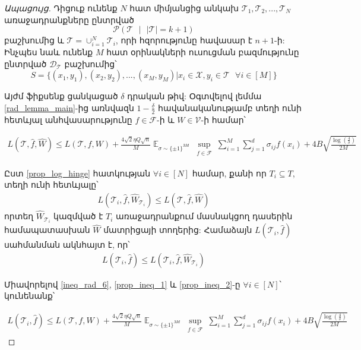 \documentclass[12pt]{article}
\DeclareMathOperator*{\E}{\mathbb{E}}
\begin{document}
\begin{proof}[Ապացույց] 
Դիցուք ունենք $N$ հատ միմյանցից անկախ $\mathcal{T}_1,\mathcal{T}_2, ...,\mathcal{T}_N$  առաջադրանքները ընտրված 
$$\mathcal{P}(\mathcal{T} \text{ } |\text{ }  |\mathcal{T}| = k +1)$$
բաշխումից և $\mathcal{T} = \cup_{i=1}^N\mathcal{T}_i$, որի հզորությունը հավասար է $n+1$-ի: Ինչպես նաև ունենք $M$ հատ օրինակների ուսուցման բազմությունը ընտրված $\mathcal{D_\mathcal{T}}$ բաշխումից՝
$$S = \{(x_1, y_1), (x_2, y_2), ..., (x_M, y_M) | x_i \in \mathcal{X}, y_i \in \mathcal{T} \text{ }\forall i \in[M]\}$$

\noindent Այժմ ֆիքսենք ցանկացած $\delta$ դրական թիվ: Օգտվելով լեմմա \ref{rad_lemma_main}-ից առնվազն $1-\frac{\delta}{2}$ հավանականությամբ տեղի ունի հետևյալ անհվասարությունը $f \in \mathcal{F}$-ի և $W \in \mathcal{V}$-ի համար՝

\begin{align}
\label{ineq_rad_6}
L(\mathcal{T}, \hat{f}, \hat{W}) \leq  L(\mathcal{T}, f, W) + \frac{4\sqrt{2} \eta Q\sqrt{n}}{M} \E_{\sigma \sim \{\pm1\}^{Md}} \sup_{\substack{ f  \in \mathcal{F}  }}\sum_{i=1}^M \sum_{j=1}^d \sigma_{ij}f(x_i)+    4B\sqrt{\frac{\log \left( \frac{4}{\delta} \right)}{2M}}
\end{align}

\noindent Ըստ \ref{prop_log_hinge} հատկության $\forall i \in [N]$ համար, քանի որ $T_i \subseteq T$, տեղի ունի հետևյալը՝
\begin{align}
\label{prop_ineq_1}
L(\mathcal{T}_i, \hat{f}, \hat{W}_{\mathcal{T}_i}) \leq L(\mathcal{T}, \hat{f}, \hat{W} )
\end{align}
 որտեղ $\hat{W}_{\mathcal{T}_i}$ կազմված է $T_i$ առաջադրանքում մասնակցող դասերին համապատասխան  $\hat{W}$ մատրիցայի տողերից: Համաձայն $L(\mathcal{T}_i, \hat{f})$ սահմանման ակնհայտ է, որ՝
\begin{align}
\label{prop_ineq_2}
L(\mathcal{T}_i, \hat{f}) \leq L(\mathcal{T}_i, \hat{f}, \hat{W}_{\mathcal{T}_i})
\end{align}

Միավորելով \ref{ineq_rad_6}, \ref{prop_ineq_1}  և \ref{prop_ineq_2}-ը $\forall i \in [N]$՝ կունենանք՝


\begin{align}
\label{ineq_rad_7}
L(\mathcal{T}_i, \hat{f}) \leq  L(\mathcal{T}, f, W) + \frac{4\sqrt{2} \eta Q\sqrt{n}}{M} \E_{\sigma \sim \{\pm1\}^{Md}} \sup_{\substack{ f  \in \mathcal{F}  }}\sum_{i=1}^M \sum_{j=1}^d \sigma_{ij}f(x_i)+    4B\sqrt{\frac{\log \left( \frac{4}{\delta} \right)}{2M}}
\end{align}


\end{proof}
\end{document}
